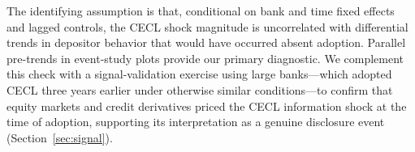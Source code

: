 The identifying assumption is that, conditional on bank and time fixed effects and
lagged controls, the CECL shock magnitude is uncorrelated with differential trends
in depositor behavior that would have occurred absent adoption. Parallel pre-trends
in event-study plots provide our primary diagnostic. We complement this check with
a signal-validation exercise using large banks—which adopted CECL three years
earlier under otherwise similar conditions—to confirm that equity markets and credit
derivatives priced the CECL information shock at the time of adoption, supporting
its interpretation as a genuine disclosure event (Section~\ref{sec:signal}).